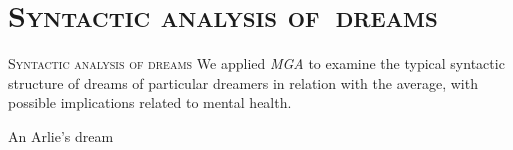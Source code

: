 \documentclass[xcolor=x11names,compress]{beamer}
\begin{document}
\section{\scshape Syntactic analysis of~dreams}
{
\begin{frame}[c]{}
    \centering
    {\scshape \LARGE \color{redUnicam} Syntactic analysis of dreams} \newline \newline
    {We applied {\it MGA} to examine the typical syntactic structure of dreams of particular dreamers in relation
    with the average, with possible implications related to mental health.}
\end{frame}}

{
\begin{frame}[t]{An Arlie's dream}
    \vspace{-0.2cm}
    
\end{frame}}
\end{document}
